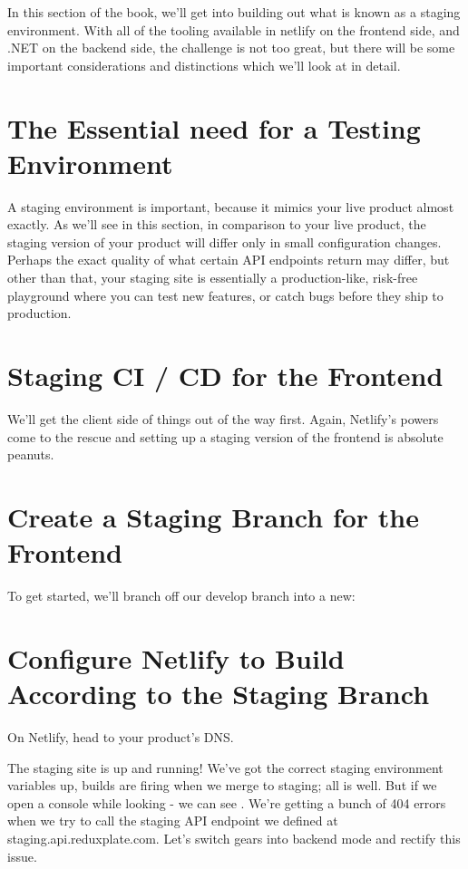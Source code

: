 \documentclass[paper=6in:9in,pagesize=pdftex,headinclude=on,footinclude=on,12pt]{scrbook}
\begin{document}
In this section of the book, we'll get into building out what is known as a staging environment. With all of the tooling available in netlify on the frontend side, and .NET on the backend side, the challenge is not too great, but there will be some important considerations and distinctions which we'll look at in detail.

\section{The Essential need for a Testing Environment}

A staging environment is important, because it mimics your live product almost exactly. As we'll see in this section, in comparison to your live product, the staging version of your product will differ only in small configuration changes. Perhaps the exact quality of what certain API endpoints return may differ, but other than that, your staging site is essentially a production-like, risk-free playground where you can test new features, or catch bugs before they ship to production.

\section{Staging CI / CD for the Frontend}

We'll get the client side of things out of the way first. Again, Netlify's powers come to the rescue and setting up a staging version of the frontend is absolute peanuts. 

\section{Create a Staging Branch for the Frontend}

To get started, we'll branch off our develop branch into a new:

\section{Configure Netlify to Build According to the Staging Branch}

On Netlify, head to your product's DNS.

The staging site is up and running! We've got the correct staging environment variables up, builds are firing when we merge to staging; all is well. But if we open a console while looking - we can see . We're getting a bunch of 404 errors when we try to call the staging API endpoint we defined at staging.api.reduxplate.com. Let's switch gears into backend mode and rectify this issue.
\end{document}
